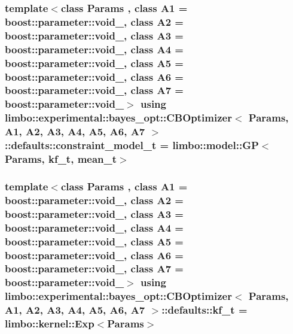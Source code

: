 \subsubsection[{\texorpdfstring{constraint\+\_\+model\+\_\+t}{constraint_model_t}}]{\setlength{\rightskip}{0pt plus 5cm}template$<$class Params , class A1  = boost\+::parameter\+::void\+\_\+, class A2  = boost\+::parameter\+::void\+\_\+, class A3  = boost\+::parameter\+::void\+\_\+, class A4  = boost\+::parameter\+::void\+\_\+, class A5  = boost\+::parameter\+::void\+\_\+, class A6  = boost\+::parameter\+::void\+\_\+, class A7  = boost\+::parameter\+::void\+\_\+$>$ using {\bf limbo\+::experimental\+::bayes\+\_\+opt\+::\+C\+B\+Optimizer}$<$ Params, A1, A2, A3, A4, A5, A6, A7 $>$\+::{\bf defaults\+::constraint\+\_\+model\+\_\+t} =  {\bf limbo\+::model\+::\+GP}$<$Params, {\bf kf\+\_\+t}, {\bf mean\+\_\+t}$>$}\hypertarget{structlimbo_1_1experimental_1_1bayes__opt_1_1_c_b_optimizer_1_1defaults_a732a30715b9697aad5c6587cca6acfd3}{}\label{structlimbo_1_1experimental_1_1bayes__opt_1_1_c_b_optimizer_1_1defaults_a732a30715b9697aad5c6587cca6acfd3}
\subsubsection[{\texorpdfstring{kf\+\_\+t}{kf_t}}]{\setlength{\rightskip}{0pt plus 5cm}template$<$class Params , class A1  = boost\+::parameter\+::void\+\_\+, class A2  = boost\+::parameter\+::void\+\_\+, class A3  = boost\+::parameter\+::void\+\_\+, class A4  = boost\+::parameter\+::void\+\_\+, class A5  = boost\+::parameter\+::void\+\_\+, class A6  = boost\+::parameter\+::void\+\_\+, class A7  = boost\+::parameter\+::void\+\_\+$>$ using {\bf limbo\+::experimental\+::bayes\+\_\+opt\+::\+C\+B\+Optimizer}$<$ Params, A1, A2, A3, A4, A5, A6, A7 $>$\+::{\bf defaults\+::kf\+\_\+t} =  {\bf limbo\+::kernel\+::\+Exp}$<$Params$>$}\hypertarget{structlimbo_1_1experimental_1_1bayes__opt_1_1_c_b_optimizer_1_1defaults_aa9c7a3f40bfc804bb27aff96a162ccaf}{}\label{structlimbo_1_1experimental_1_1bayes__opt_1_1_c_b_optimizer_1_1defaults_aa9c7a3f40bfc804bb27aff96a162ccaf}
